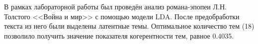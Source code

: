 
В рамках лабораторной работы был проведён анализ романа-эпопеи Л.Н. Толстого <<Война и мир>> с помощью модели LDA. После предобработки текста из него были выделены латентные темы. Оптимальное количество тем (18) позволило получить значение показателя когерентности тем, равное 0.4035.
